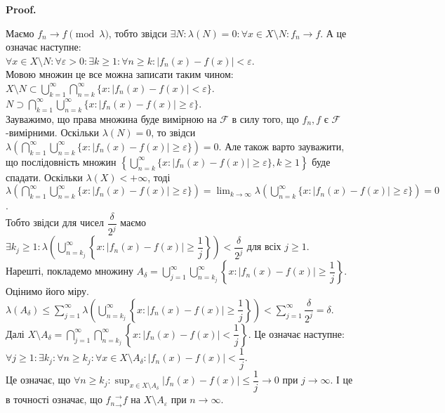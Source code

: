 \documentclass[a4paper, 10pt]{article}
\makeatletter
\theoremstyle{theoremdd}
\renewenvironment{proof}[1][Proof.\\]{\par
\pushQED{\hfill \qed}%
\normalfont \topsep6\p@\@plus6\p@\relax
\trivlist
\item\relax
{\bfseries
#1\@addpunct{.}}\hspace\labelsep\ignorespaces
}{%
\popQED\endtrivlist\@endpefalse
}
\makeatother
\begin{document}
\begin{proof}
Маємо $f_n \to f \pmod \lambda$, тобто звідси $\exists N: \lambda(N) = 0: \forall x \in X \setminus N: f_n \to f$. А це означає наступне:\\
$\forall x \in X \setminus N: \forall \varepsilon > 0: \exists k \geq 1: \forall n \geq k: |f_n(x)-f(x)| < \varepsilon$.\\
Мовою множин це все можна записати таким чином:\\
$X \setminus N \subset \displaystyle\bigcup_{k=1}^\infty \bigcap_{n = k}^\infty \{x : |f_n(x)-f(x)| < \varepsilon\}$.\\
$\displaystyle N \supset \bigcap_{k=1}^\infty \bigcup_{n = k}^\infty \{x : |f_n(x)-f(x)| \geq \varepsilon\}$.\\
Зауважимо, що права множина буде вимірною на $\mathcal{F}$ в силу того, що $f_n,f$ є $\mathcal{F}$-вимірними. Оскільки $\lambda(N) = 0$, то звідси $\displaystyle\lambda\left( \bigcap_{k=1}^\infty \bigcup_{n = k}^\infty \{x : |f_n(x)-f(x)| \geq \varepsilon\} \right) = 0$. Але також варто зауважити, що послідовність множин $\displaystyle\left\{ \bigcup_{n = k}^\infty \{x : |f_n(x)-f(x)| \geq \varepsilon\}, k \geq 1 \right\}$ буде спадати. Оскільки $\lambda(X) < +\infty$, тоді $\displaystyle\lambda\left( \bigcap_{k=1}^\infty \bigcup_{n = k}^\infty \{x : |f_n(x)-f(x)| \geq \varepsilon\} \right) = \lim_{k \to \infty} \lambda\left( \bigcup_{n=k}^\infty \{x: |f_n(x)-f(x)| \geq \varepsilon\} \right) = 0$.\\
Тобто звідси для чисел $\dfrac{\delta}{2^j}$ маємо $\displaystyle\exists k_j \geq 1: \lambda\left( \bigcup_{n=k_j}^\infty \left\{x : |f_n(x)-f(x)| \geq \dfrac{1}{j}\right\} \right) < \dfrac{\delta}{2^j}$ для всіх $j \geq 1$.\\
Нарешті, покладемо множину $A_\delta = \displaystyle\bigcup_{j=1}^\infty \bigcup_{n=k_j}^\infty \left\{x : |f_n(x)-f(x)| \geq \dfrac{1}{j} \right\}$. Оцінимо його міру.\\
$\lambda(A_\delta) \leq \displaystyle\sum_{j=1}^\infty \lambda\left( \bigcup_{n=k_j}^\infty \left\{x: |f_n(x)-f(x)| \geq \dfrac{1}{j} \right\} \right) < \sum_{j=1}^\infty \dfrac{\delta}{2^j} = \delta$.\\
Далі $X \setminus A_\delta = \displaystyle\bigcap_{j=1}^\infty \bigcap_{n = k_j}^\infty \left\{x : |f_n(x) - f(x)| < \dfrac{1}{j} \right\}$. Це означає наступне:\\
$\forall j \geq 1: \exists k_j: \forall n \geq k_j: \forall x \in X \setminus A_\delta: |f_n(x)-f(x)| < \dfrac{1}{j}$.\\
Це означає, що $\forall n \geq k_j: \displaystyle\sup_{x \in X \setminus A_\delta} |f_n(x)-f(x)| \leq \dfrac{1}{j} \to 0$ при $j \to \infty$. І це в точності означає, що ${f_n}^\rightarrow_\rightarrow f$ на $X \setminus A_\varepsilon$ при $n \to \infty$.
\end{proof}
\end{document}
